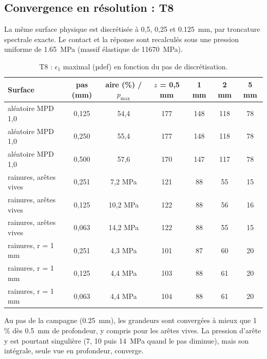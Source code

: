 \subsection{Convergence en résolution : T8}\label{sec:resolution}
La même surface physique est discrétisée à 0,5, 0,25 et \SI{0.125}{mm}, par troncature spectrale
exacte. Le contact et la réponse sont recalculés sous une pression uniforme de \SI{1.65}{MPa}
(massif élastique de \SI{11670}{MPa}).
\begin{table}[H]\centering\small
\caption{T8 : $\epsilon_1$ maximal (µdef) en fonction du pas de discrétisation.}
\begin{tabular}{lcccccc}
\toprule
Surface & pas (mm) & aire (\%) / $p_{\max}$ & $z$ = 0,5 mm & 1 mm & 2 mm & 5 mm\\
\midrule
aléatoire MPD 1,0 & 0,125 & 54,4 & 177 & 148 & 118 & 78\\
aléatoire MPD 1,0 & 0,250 & 55,4 & 177 & 148 & 118 & 78\\
aléatoire MPD 1,0 & 0,500 & 57,6 & 170 & 147 & 117 & 78\\
rainures, arêtes vives & 0,251 & 7,2 MPa & 121 & 88 & 55 & 15\\
rainures, arêtes vives & 0,125 & 10,2 MPa & 122 & 88 & 56 & 16\\
rainures, arêtes vives & 0,063 & 14,2 MPa & 122 & 88 & 55 & 15\\
rainures, r = 1 mm & 0,251 & 4,3 MPa & 101 & 87 & 60 & 20\\
rainures, r = 1 mm & 0,125 & 4,4 MPa & 103 & 88 & 61 & 20\\
rainures, r = 1 mm & 0,063 & 4,4 MPa & 104 & 88 & 61 & 20\\
\bottomrule
\end{tabular}
\end{table}
Au pas de la campagne (\SI{0.25}{mm}), les grandeurs sont convergées à mieux que 1\,\% dès
\SI{0.5}{mm} de profondeur, y compris pour les arêtes vives. La pression d'arête y est pourtant
singulière (7, 10 puis \SI{14}{MPa} quand le pas diminue), mais son intégrale, seule vue en
profondeur, converge.

